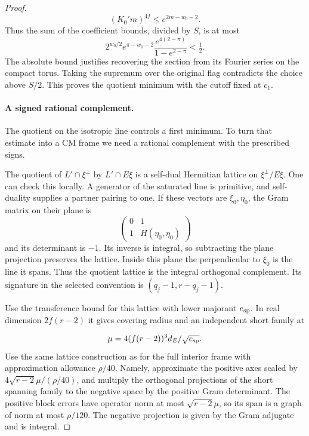 \begin{proof}
\[
  (K_0'm)^{4f}\le e^{2m-w_0-2}.
\]
Thus the sum of the coefficient bounds, divided by \(S\), is
at most
\[
 2^{w_0/2} e^{\pi-w_0-2}
 \frac{e^{4(2-\pi)}}{1-e^{2-\pi}}<\tfrac12 .
\]
The absolute bound justifies recovering the section from its
Fourier series on the compact torus. Taking the supremum over
the original flag contradicts the choice above \(S/2\). This
proves the quotient minimum with the cutoff fixed at \(c_1\).
\label{cor:slice-split-frame-1}

\paragraph{A signed rational complement.}

The quotient on the isotropic line controls a first minimum. To turn that estimate into a CM frame we need a rational complement with the prescribed signs.

The quotient of \(L'\cap\xi^\perp\) by \(L'\cap E\xi\) is
a self-dual Hermitian lattice on \(\xi^\perp/E\xi\).
One can check this locally. A generator of the saturated line
is primitive, and self-duality supplies a partner pairing to one.
If these vectors are \(\xi_0,\eta_0\), the Gram
matrix on their plane is
\[
 \begin{pmatrix}0&1\\1&H(\eta_0,\eta_0)\end{pmatrix}
\]
and its determinant is \(-1\). Its inverse is integral,
so subtracting the plane projection preserves the lattice.
Inside this plane the perpendicular to \(\xi_0\) is
the line it spans. Thus the quotient lattice is the
integral orthogonal complement. Its signature in the selected convention
is \((q_j-1,r-q_j-1)\).

Use the transference bound for this lattice with lower majorant
\(e_{\rm sp}\). In real dimension \(2f(r-2)\) it gives covering
radius and an independent short family at

\[
  \mu=4(f(r-2))^3d_E/\sqrt{e_{\rm sp}}.
\]
Use the same lattice construction as for the full interior frame
with approximation allowance \(\rho/40\). Namely, approximate
the positive axes scaled by \(4\sqrt{r-2}\mu/(\rho/40)\),
and multiply the orthogonal projections of the short spanning
family to the negative space by the positive Gram determinant.
The positive block errors have operator norm at most
\(\sqrt{r-2}\mu\), so its span is a graph of norm at most
\(\rho/120\). The negative projection is given by the Gram
adjugate and is integral.


\end{proof}
